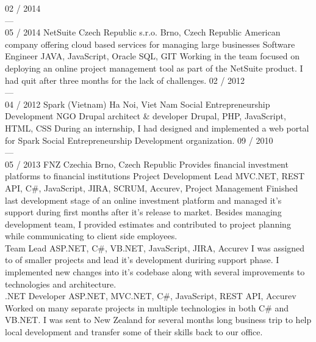 \documentclass[]{friggeri-cv} %
\begin{document}
\begin{entrylist}
  \job
  {02 / 2014 \\ --- \\ 05 / 2014}
  {NetSuite Czech Republic s.r.o.}
  {Brno, Czech Republic}
  {American company offering cloud based services for managing large businesses}
  {
    \position
    {Software Engineer}
    {JAVA, JavaScript, Oracle SQL, GIT}
    {Working in the team focused on deploying an online project management tool as part of the NetSuite product.
    I had quit after three months for the lack of challenges.}
  }
  \job
  {02 / 2012 \\ --- \\ 04 / 2012}
  {Spark (Vietnam)}
  {Ha Noi, Viet Nam}
  {Social Entrepreneurship Development NGO}
  {
    \position
    {Drupal architect \& developer}
    {Drupal, PHP, JavaScript, HTML, CSS}
    {During an internship, I had designed and implemented a web portal for Spark Social Entrepreneurship Development organization.}
  }
  \job
  {09 / 2010 \\ --- \\ 05 / 2013}
  {FNZ Czechia}
  {Brno, Czech Republic}
  {Provides financial investment platforms to financial institutions}
  {
    \position
    {Project Development Lead}
    {MVC.NET, REST API, C\#, JavaScript, JIRA, SCRUM, Accurev, Project Management}
    {Finished last development stage of an online investment platform and managed it's support during first months after it's
    release to market. Besides managing development team, I provided estimates and contributed to project planning
    while communicating to client side employees.}\\
    \position
    {Team Lead}
    {ASP.NET, C\#, VB.NET, JavaScript, JIRA, Accurev}
    {I was assigned to of smaller projects and lead it's development duriring support phase. I implemented new changes
    into it's codebase along with several improvements to technologies and architecture.}\\
    \position
    {.NET Developer}
    {ASP.NET, MVC.NET, C\#, JavaScript, REST API, Accurev}
    {Worked on many separate projects in multiple technologies in both C\# and VB.NET. I was sent to New Zealand for
    several months long business trip to help local development and transfer some of their skills back to our office.}%
  }
\end{entrylist}
\end{document}
